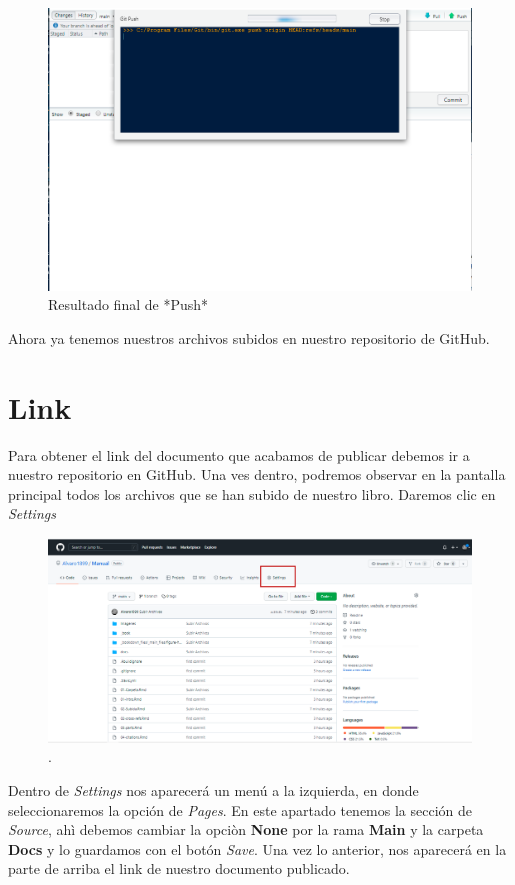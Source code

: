 \documentclass[
  11pt,
  spanish,
  oneside]{book}
\begin{document}
\begin{figure}

{\centering \includegraphics[width=0.7\linewidth]{imagenes/Imagen 13} 

}

\caption{Resultado final de *Push*}\label{fig:unnamed-chunk-13}
\end{figure}

Ahora ya tenemos nuestros archivos subidos en nuestro repositorio de GitHub.

\hypertarget{link}{%
\section*{Link}\label{link}}

Para obtener el link del documento que acabamos de publicar debemos ir a nuestro repositorio en GitHub. Una ves dentro, podremos observar en la pantalla principal todos los archivos que se han subido de nuestro libro. Daremos clic en \emph{Settings}

\begin{figure}

{\centering \includegraphics[width=0.7\linewidth]{imagenes/Imagen 14} 

}

\caption{.}\label{fig:unnamed-chunk-14}
\end{figure}

Dentro de \emph{Settings} nos aparecerá un menú a la izquierda, en donde seleccionaremos la opción de \emph{Pages}. En este apartado tenemos la sección de \emph{Source}, ahì debemos cambiar la opciòn \textbf{None} por la rama \textbf{Main} y la carpeta \textbf{Docs} y lo guardamos con el botón \emph{Save}. Una vez lo anterior, nos aparecerá en la parte de arriba el link de nuestro documento publicado.
\end{document}
